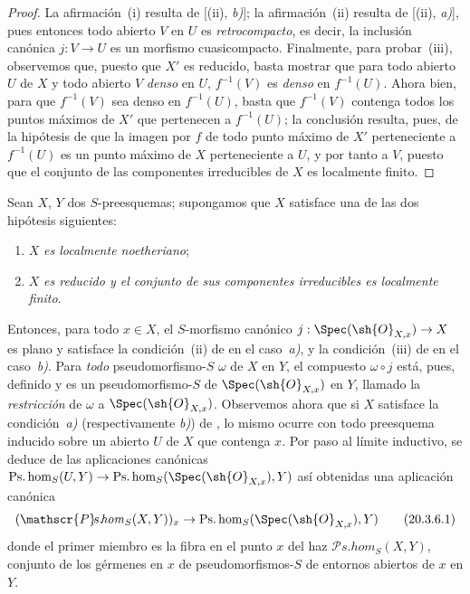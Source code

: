 \begin{proof}
La afirmación~(i) resulta de [(ii), \emph{b)}]; la afirmación~(ii) resulta de [(ii), \emph{a)}], pues entonces todo abierto $V$ en $U$ es \emph{retrocompacto}, es decir, la inclusión canónica $j:V\to U$ es un morfismo cuasicompacto.
Finalmente, para probar~(iii), observemos que, puesto que $X'$ es reducido, basta mostrar que para todo abierto $U$ de $X$ y todo abierto $V$ \emph{denso} en $U$, $f^{-1}(V)$ es \emph{denso} en $f^{-1}(U)$.
Ahora bien, para que $f^{-1}(V)$ sea denso en $f^{-1}(U)$, basta que $f^{-1}(V)$ contenga todos los puntos máximos de $X'$ que pertenecen a $f^{-1}(U)$; la conclusión resulta, pues, de la hipótesis de que la imagen por $f$ de todo punto
máximo de $X'$ perteneciente a $f^{-1}(U)$ es un punto máximo de $X$ perteneciente a $U$, y por tanto a $V$, puesto que el conjunto de las componentes irreducibles de $X$ es localmente finito.
\end{proof}

\begin{env}[20.3.6]
\label{IV.20.3.6}
Sean $X$, $Y$ dos $S$-preesquemas; supongamos que $X$ satisface una de las dos hipótesis siguientes:
\begin{enumerate}[label=\alph*)]
  \item $X$ \emph{es localmente noetheriano};
  \item $X$ \emph{es reducido y el conjunto de sus componentes irreducibles es localmente finito}.
\end{enumerate}
Entonces, para todo $x\in X$, el $S$-morfismo canónico $j:\Spec(\sh{O}_{X,x})\to X$ es plano y satisface la condición~(ii) de  en el caso~\emph{a)}, y la condición~(iii) de  en el caso~\emph{b)}.
Para \emph{todo} pseudomorfismo-$S$ $\omega$ de $X$ en $Y$, el compuesto $\omega\circ j$ está, pues, definido y es un pseudomorfismo-$S$ de $\Spec(\sh{O}_{X,x})$ en $Y$, llamado la \emph{restricción} de $\omega$ a $\Spec(\sh{O}_{X,x})$.
Observemos ahora que si $X$ satisface la condición~\emph{a)} (respectivamente \emph{b)}) de , lo mismo ocurre con todo preesquema inducido sobre un abierto $U$ de $X$ que contenga $x$.
Por paso al límite inductivo, se deduce de las aplicaciones canónicas $\operatorname{Ps.hom}_S(U,Y)\to\operatorname{Ps.hom}_S(\Spec(\sh{O}_{X,x}),Y)$ así obtenidas una aplicación canónica
\[
\label{IV.20.3.6.1}
  (\mathscr{P}\!s.\!\mathit{hom}_S(X,Y))_x\to\operatorname{Ps.hom}_S(\Spec(\sh{O}_{X,x}),Y)
  \tag{20.3.6.1}
\]
donde el primer miembro es la fibra en el punto $x$ del haz $\mathscr{P}\!s.\!\mathit{hom}_S(X,Y)$, conjunto de los gérmenes en $x$ de pseudomorfismos-$S$ de entornos abiertos de $x$ en $Y$.
\end{env}

